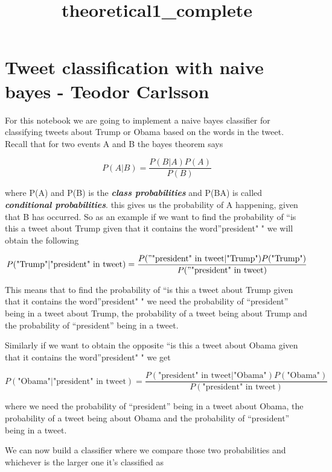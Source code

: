 \documentclass[11pt]{article}
\title{theoretical1\_complete}
\begin{document}
    
    \maketitle
    
    

    
    \hypertarget{tweet-classification-with-naive-bayes---teodor-carlsson}{%
\section{Tweet classification with naive bayes - Teodor
Carlsson}\label{tweet-classification-with-naive-bayes---teodor-carlsson}}

For this notebook we are going to implement a naive bayes classifier for
classifying tweets about Trump or Obama based on the words in the tweet.
Recall that for two events A and B the bayes theorem says

\[ P(A|B) = \frac{P(B|A)P(A)}{P(B)} \]

where P(A) and P(B) is the \textbf{\emph{class probabilities}} and
P(B\textbar A) is called \textbf{\emph{conditional probabilities}}. this
gives us the probability of A happening, given that B has occurred. So
as an example if we want to find the probability of ``is this a tweet
about Trump given that it contains the word''president" " we will obtain
the following

\[ P(\text{"Trump"}|\text{"president" in tweet}) = \frac{P("\text{"president" in tweet}|\text{"Trump"})P(\text{"Trump"})}{P("\text{"president" in tweet})} \]

This means that to find the probability of ``is this a tweet about Trump
given that it contains the word''president" " we need the probability of
``president'' being in a tweet about Trump, the probability of a tweet
being about Trump and the probability of ``president'' being in a tweet.

Similarly if we want to obtain the opposite ``is this a tweet about
Obama given that it contains the word''president" " we get

\[ P(\text{"Obama"}|\text{"president" in tweet}) = \frac{P(\text{"president" in tweet}|\text{"Obama"})P(\text{"Obama"})}{P(\text{"president" in tweet})} \]

where we need the probability of ``president'' being in a tweet about
Obama, the probability of a tweet being about Obama and the probability
of ``president'' being in a tweet.

We can now build a classifier where we compare those two probabilities
and whichever is the larger one it's classified as
\end{document}
